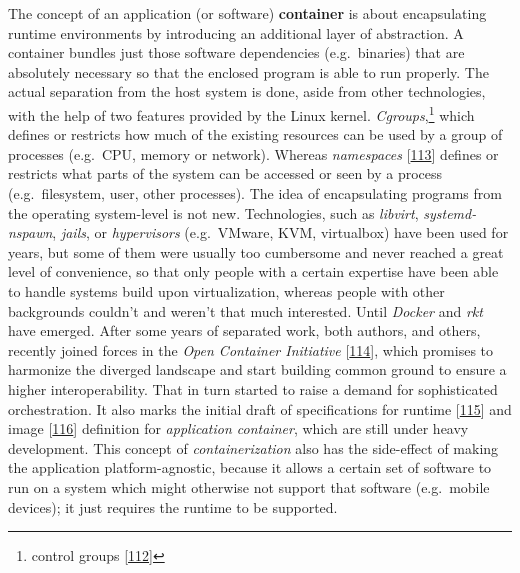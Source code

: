 \documentclass[12pt,english,a4paper,titlepage,cleardoublepage=empty,dottedtoc]{report}
\begin{document}
The concept of an application (or software)
\textbf{\protect\hypertarget{link-container}{}{container}} is about
encapsulating runtime environments by introducing an additional layer of
abstraction. A container bundles just those software dependencies
(e.g.~binaries) that are absolutely necessary so that the enclosed
program is able to run properly. The actual separation from the host
system is done, aside from other technologies, with the help of two
features provided by the Linux kernel. \emph{Cgroups},\footnote{control
  groups {[}\protect\hyperlink{ref-web_2015_cgroup-doc}{112}{]}} which
defines or restricts how much of the existing resources can be used by a
group of processes (e.g.~CPU, memory or network). Whereas
\emph{namespaces}
{[}\protect\hyperlink{ref-web_2016_kernel-namespace}{113}{]} defines or
restricts what parts of the system can be accessed or seen by a process
(e.g.~filesystem, user, other processes). The idea of encapsulating
programs from the operating system-level is not new. Technologies, such
as \emph{libvirt}, \emph{systemd-nspawn}, \emph{jails}, or
\emph{hypervisors} (e.g.~VMware, KVM, virtualbox) have been used for
years, but some of them were usually too cumbersome and never reached a
great level of convenience, so that only people with a certain expertise
have been able to handle systems build upon virtualization, whereas
people with other backgrounds couldn't and weren't that much interested.
Until \emph{Docker} and \emph{rkt} have emerged. After some years of
separated work, both authors, and others, recently joined forces in the
\emph{Open Container Initiative}
{[}\protect\hyperlink{ref-web_2016_open-container-initiative}{114}{]},
which promises to harmonize the diverged landscape and start building
common ground to ensure a higher interoperability. That in turn started
to raise a demand for sophisticated orchestration. It also marks the
initial draft of specifications for runtime
{[}\protect\hyperlink{ref-web_oci-spec_runtime}{115}{]} and image
{[}\protect\hyperlink{ref-web_oci-spec_image}{116}{]} definition for
\emph{application container}, which are still under heavy development.
This concept of \emph{containerization} also has the side-effect of
making the application platform-agnostic, because it allows a certain
set of software to run on a system which might otherwise not support
that software (e.g.~mobile devices); it just requires the runtime to be
supported.
\end{document}
